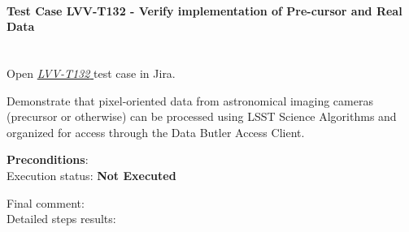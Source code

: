 \documentclass[DM,lsstdraft,STR,toc]{lsstdoc}
\begin{document}
\paragraph{Test Case LVV-T132 -  Verify implementation of Pre-cursor and Real Data
 }\mbox{}\\

Open  \href{https://jira.lsstcorp.org/secure/Tests.jspa#/testCase/LVV-T132}{\textit{ LVV-T132 } }
test case in Jira.

 Demonstrate that pixel-oriented data from astronomical imaging cameras
(precursor or otherwise) can be processed using LSST Science Algorithms
and organized for access through the Data Butler Access Client. ~


\textbf{ Preconditions}:\\


Execution status: {\bf Not Executed }

Final comment:\\


Detailed steps results:
\end{document}
